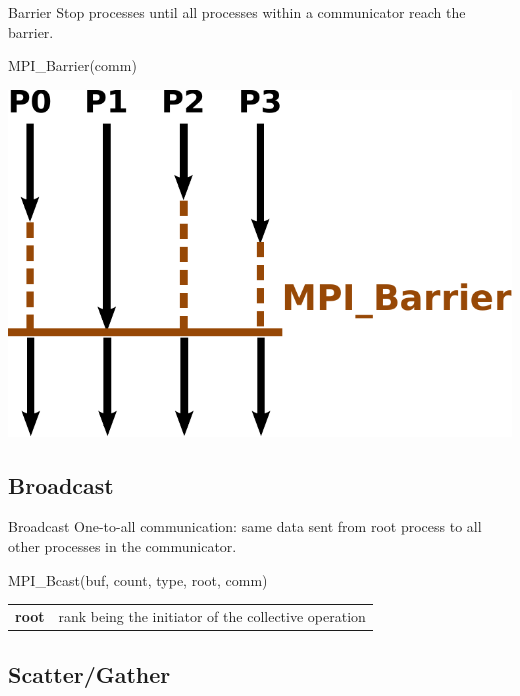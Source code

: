 \documentclass[aspectratio=43]{beamer}
\begin{document}
\begin{frame}[fragile]{Barrier}
Stop processes until all processes within a communicator reach the barrier.\\
\begin{Pseudolisting}[]{}
MPI_Barrier(comm)
\end{Pseudolisting}
\begin{center}
\includegraphics[scale=0.5]{03.MPI_Coll/barrier.pdf}
\end{center}
\end{frame}

\subsection{Broadcast}
\begin{frame}[fragile]{Broadcast}
One-to-all communication: same data sent from root process to all other processes in the communicator.\\
\begin{Pseudolisting}[]{}
MPI_Bcast(buf, count, type, root, comm)
\end{Pseudolisting}
\begin{black1block}{}
\begin{tabular}{rp{8cm}}
\textbf{root} & rank being the initiator of the collective operation\\
\end{tabular}
\end{black1block}
\end{frame}

\subsection{Scatter/Gather}
\end{document}
